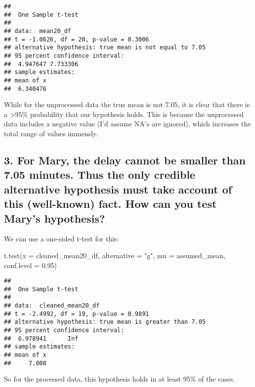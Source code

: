 \documentclass[
]{article}
\newenvironment{Shaded}{\begin{snugshade}}{\end{snugshade}}
\newcommand{\AttributeTok}[1]{\textcolor[rgb]{0.77,0.63,0.00}{#1}}
\newcommand{\FloatTok}[1]{\textcolor[rgb]{0.00,0.00,0.81}{#1}}
\newcommand{\FunctionTok}[1]{\textcolor[rgb]{0.00,0.00,0.00}{#1}}
\newcommand{\NormalTok}[1]{#1}
\newcommand{\StringTok}[1]{\textcolor[rgb]{0.31,0.60,0.02}{#1}}
\begin{document}
\begin{verbatim}
## 
##  One Sample t-test
## 
## data:  mean20_df
## t = -1.0626, df = 20, p-value = 0.3006
## alternative hypothesis: true mean is not equal to 7.05
## 95 percent confidence interval:
##  4.947647 7.733306
## sample estimates:
## mean of x 
##  6.340476
\end{verbatim}

While for the unprocessed data the true mean is not 7.05, it is clear
that there is a \textgreater95\% probability that our hypothesis holds.
This is because the unprocessed data includes a negative value (I'd
assume NA's are ignored), which increases the total range of values
immensly.

\newpage

\hypertarget{for-mary-the-delay-cannot-be-smaller-than-7.05-minutes.-thus-the-only-credible-alternative-hypothesis-must-take-account-of-this-well-known-fact.-how-can-you-test-marys-hypothesis}{%
\subsection{3. For Mary, the delay cannot be smaller than 7.05 minutes.
Thus the only credible alternative hypothesis must take account of this
(well-known) fact. How can you test Mary's
hypothesis?}\label{for-mary-the-delay-cannot-be-smaller-than-7.05-minutes.-thus-the-only-credible-alternative-hypothesis-must-take-account-of-this-well-known-fact.-how-can-you-test-marys-hypothesis}}

We can use a one-sided t-test for this:

\begin{Shaded}
\begin{Highlighting}[]
\FunctionTok{t.test}\NormalTok{(}\AttributeTok{x =}\NormalTok{ cleaned\_mean20\_df, }\AttributeTok{alternative =} \StringTok{"g"}\NormalTok{, }\AttributeTok{mu =}\NormalTok{ assumed\_mean, }\AttributeTok{conf.level =} \FloatTok{0.95}\NormalTok{)}
\end{Highlighting}
\end{Shaded}

\begin{verbatim}
## 
##  One Sample t-test
## 
## data:  cleaned_mean20_df
## t = -2.4992, df = 19, p-value = 0.9891
## alternative hypothesis: true mean is greater than 7.05
## 95 percent confidence interval:
##  6.978941      Inf
## sample estimates:
## mean of x 
##     7.008
\end{verbatim}

So for the processed data, this hypothesis holds in at least 95\% of the
cases.
\end{document}
